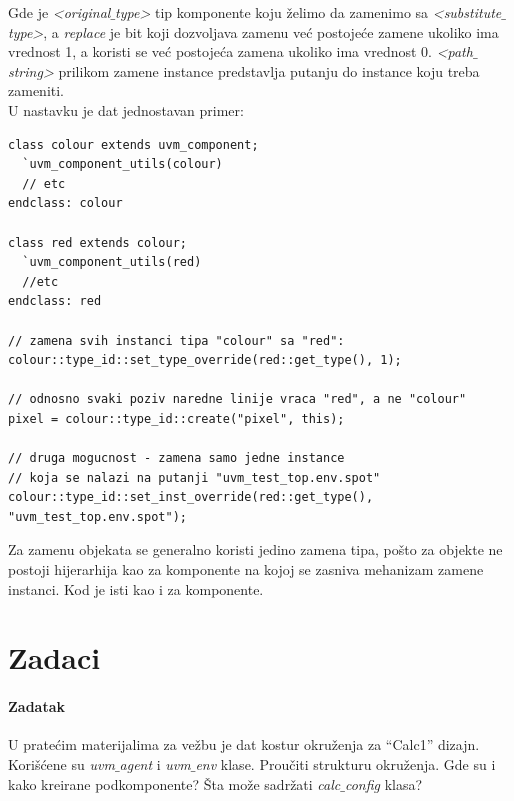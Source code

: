 Gde je \emph{\textless original\(\_\)type\textgreater} tip komponente koju
želimo da zamenimo sa \emph{\textless substitute\(\_\)type\textgreater}, a
\emph{replace} je bit koji dozvoljava zamenu već postojeće zamene ukoliko ima
vrednost 1, a koristi se već postojeća zamena ukoliko ima vrednost 0.
\emph{\textless path\(\_\)string\textgreater} prilikom zamene instance
predstavlja putanju do instance koju treba zameniti.\\

U nastavku je dat jednostavan primer:

\begin{lstlisting}
class colour extends uvm_component;
  `uvm_component_utils(colour)
  // etc
endclass: colour

class red extends colour;
  `uvm_component_utils(red)
  //etc
endclass: red

// zamena svih instanci tipa "colour" sa "red":
colour::type_id::set_type_override(red::get_type(), 1);

// odnosno svaki poziv naredne linije vraca "red", a ne "colour"
pixel = colour::type_id::create("pixel", this);

// druga mogucnost - zamena samo jedne instance
// koja se nalazi na putanji "uvm_test_top.env.spot"
colour::type_id::set_inst_override(red::get_type(), "uvm_test_top.env.spot");
\end{lstlisting}

Za zamenu objekata se generalno koristi jedino zamena tipa, pošto za objekte ne
postoji hijerarhija kao za komponente na kojoj se zasniva mehanizam zamene
instanci. Kod je isti kao i za komponente.


\section{Zadaci}

\paragraph{Zadatak}

U pratećim materijalima za vežbu je dat kostur okruženja za ``Calc1'' dizajn.
Korišćene su \emph{uvm\(\_\)agent} i \emph{uvm\(\_\)env} klase. Proučiti
strukturu okruženja. Gde su i kako kreirane podkomponente? Šta može sadržati
\emph{calc\(\_\)config} klasa?

